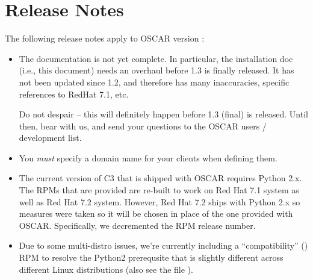 %
%
%

\section{Release Notes}
\label{sec:release-notes}
The following release notes apply to OSCAR version \oscarversion:

\begin{itemize}
\item The documentation is not yet complete.  In particular, the
  installation doc (i.e., this document) needs an overhaul before 1.3
  is finally released.  It has not been updated since 1.2, and
  therefore has many inaccuracies, specific references to RedHat 7.1,
  etc.
  
  Do not despair -- this will definitely happen before 1.3 (final) is
  released.  Until then, bear with us, and send your questions to the
  OSCAR users / development list.
  
\item You {\em must} specify a domain name for your clients when
  defining them.
  
\item The current version of C3 that is shipped with OSCAR requires
  Python 2.x.  The RPMs that are provided are re-built to work on Red
  Hat 7.1 system as well as Red Hat 7.2 system.  However, Red Hat 7.2
  ships with Python 2.x so measures were taken so it will be chosen in
  place of the one provided with OSCAR.  Specifically, we decremented
  the RPM release number.
  
\item Due to some multi-distro issues, we're currently including a
  ``compatibility'' () RPM to resolve the
  Python2 prerequsite that is slightly different across different
  Linux distributions (also see the file
  ).
\end{itemize}


